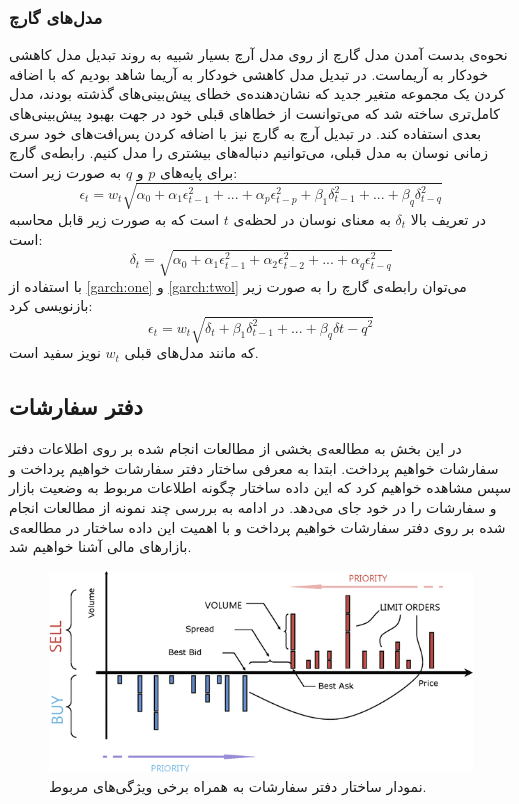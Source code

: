 \subsubsection{مدل‌های گارچ}
نحوه‌ی بدست آمدن مدل‌ گارچ از روی مدل‌ آرچ بسیار شبیه به روند تبدیل مدل‌ کاهشی خودکار به آریماست. در تبدیل مدل کاهشی خودکار به آریما شاهد بودیم که با اضافه کردن یک مجموعه متغیر جدید که نشان‌دهنده‌ی خطای پیش‌بینی‌های گذشته بودند، مدل‌ کامل‌تری ساخته شد که می‌توانست از خطاهای قبلی خود در جهت بهبود پیش‌بینی‌های بعدی استفاده کند. در تبدیل آرچ به گارچ نیز با اضافه کردن پس‌افت‌های خود سری زمانی نوسان به مدل قبلی،‌ می‌توانیم دنباله‌های بیشتری را مدل کنیم. رابطه‌ی گارچ برای پایه‌های $p$ و $q$ به صورت زیر است:
\begin{equation}
	\label{garch:one}
	\epsilon_t = w_t \sqrt{\alpha_0 + \alpha_1 \epsilon_{t-1}^2 + ... + \alpha_p \epsilon_{t-p}^2 + \beta_1 \delta_{t-1}^2 + ... + \beta_q \delta_{t-q}^2}
\end{equation}
در تعریف بالا $\delta_{t}$ به معنای نوسان در لحظه‌ی $t$ است که به صورت زیر قابل محاسبه است:
\begin{equation}
	\label{garch:twol}
	\delta_t = \sqrt{\alpha_0 + \alpha_1 \epsilon_{t-1}^2 + \alpha_2 \epsilon_{t-2}^2 + ... + \alpha_q \epsilon_{t-q}^2}
\end{equation}
با استفاده از \ref{garch:one} و \ref{garch:twol} می‌توان رابطه‌ی گارچ را به صورت زیر بازنویسی کرد:
\begin{equation}
	\epsilon_t = w_t \sqrt{\delta_{t} + \beta_1 \delta_{t-1}^2 + ... + \beta_q \delta{t-q}^2}
\end{equation}
که مانند مدل‌های قبلی $w_t$ نویز سفید است.
\subsection{دفتر سفارشات}
در این بخش به مطالعه‌ی بخشی از مطالعات انجام شده بر روی اطلاعات دفتر سفارشات خواهیم پرداخت. ابتدا به معرفی ساختار دفتر سفارشات خواهیم پرداخت و سپس مشاهده‌ خواهیم کرد که این داده ساختار چگونه اطلاعات مربوط به وضعیت بازار و سفارشات را در خود جای می‌دهد. در ادامه به بررسی چند نمونه از مطالعات انجام شده بر روی دفتر سفارشات خواهیم پرداخت و با اهمیت این داده ساختار در مطالعه‌ی بازارهای مالی آشنا خواهیم شد.
\begin{figure}[!t]
	\includegraphics[width=1.0 \textwidth]{images/orderbook_1}
	\centering
	\caption{ نمودار ساختار دفتر سفارشات به همراه برخی ویژگی‌های مربوط\cite{brabazon2016characterising}.
	}
	\label{fig.orderbook_1}
\end{figure}

